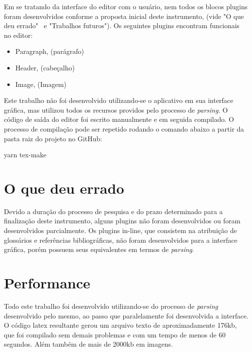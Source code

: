 Em se tratando da interface do editor com o usuário, nem todos os blocos plugins foram desenvolvidos
conforme a proposta inicial deste instrumento, (vide "O que deu errado"~ e "Trabalhos futuros").
Os seguintes plugins encontram funcionais no editor:

\begin{itemize}
        
	\item Paragraph, (parágrafo)
	\item Header, (cabeçalho)
	\item Image, (Imagem)
    
\end{itemize}

Este trabalho não foi desenvolvido utilizando-se o aplicativo em sua interface gráfica, mas utilizou todos os recursos providos pelo processo de \textit{parsing}. O código de saída do editor foi escrito manualmente e em seguida compilado. O processo de compilação pode ser repetido rodando o comando abaixo a partir da pasta raiz do projeto no GitHub:

\begin{Code57a189bb607e447287a6babdabb4e4ca}
yarn tex-make
\end{Code57a189bb607e447287a6babdabb4e4ca}

\section{O que deu errado}

Devido a duração do processo de pesquisa e do prazo determinado para a finalização deste instrumento,
alguns plugins não foram desenvolvidos ou foram desenvolvidos parcialmente. Os plugins in-line, que consistem
na atribuição de glossários e referências bibliográficas, não foram desenvolvidos para a interface gráfica,
porém possuem seus equivalentes em termos de \textit{parsing}.

\section{Performance}

Todo este trabalho foi desenvolvido utilizando-se do processo de \textit{parsing} desenvolvido pelo mesmo, ao passo que
paralelamente foi desenvolvida a interface.
O código
\acrshort{latex}
resultante gerou um arquivo texto de aproximadamente 176kb, que foi compilado sem demais problemas
e com um tempo de menos de 60 segundos. Além também de mais de 2000kb em imagens.

